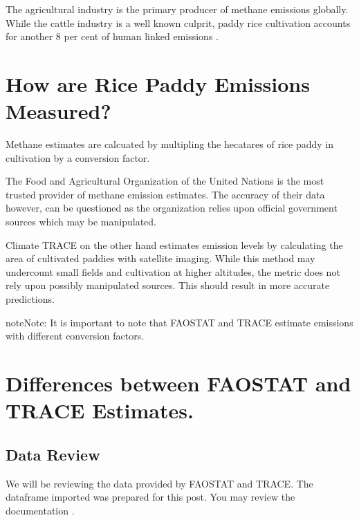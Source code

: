 \documentclass[letterpaper,10pt,english]{jupyterBook}
\begin{document}
\sphinxAtStartPar
The agricultural industry is the primary producer of methane emissions globally.  While the cattle industry is a well known culprit, paddy rice cultivation accounts for another 8 per cent of human linked emissions .


\section{How are Rice Paddy Emissions Measured?}
\label{\detokenize{notebooks/hidden_post:how-are-rice-paddy-emissions-measured}}
\sphinxAtStartPar
Methane estimates are calcuated by multipling the hecatares of rice paddy in cultivation by a conversion factor.

\sphinxAtStartPar
The Food and Agricultural Organization of the United Nations  is the most trusted provider of methane emission estimates.  The accuracy of their data however, can be questioned as the organization relies upon official government sources which may be manipulated.

\sphinxAtStartPar
Climate TRACE  on the other hand estimates emission levels by calculating the area of cultivated paddies with satellite imaging.   While this method may undercount small fields and cultivation at higher altitudes, the metric does not rely upon possibly manipulated sources. This should result in more accurate predictions.

\begin{sphinxadmonition}{note}{Note:}
\sphinxAtStartPar
It is important to note that FAOSTAT and TRACE estimate emissions with different conversion factors.
\end{sphinxadmonition}


\section{Differences between FAOSTAT and TRACE Estimates.}
\label{\detokenize{notebooks/hidden_post:differences-between-faostat-and-trace-estimates}}

\subsection{Data Review}
\label{\detokenize{notebooks/hidden_post:data-review}}
\sphinxAtStartPar
We will be reviewing the data provided by FAOSTAT and TRACE.  The dataframe imported was prepared for this post.  You may review the documentation {\hyperref[\detokenize{notebooks/data_exploration:data-exploration-title}]{}}.
\end{document}
